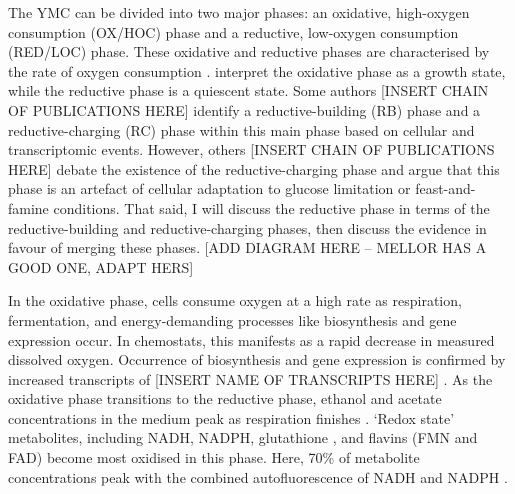 The YMC can be divided into two major phases: an oxidative, high-oxygen consumption (OX/HOC) phase and a reductive, low-oxygen consumption (RED/LOC) phase.
These oxidative and reductive phases are characterised by the rate of oxygen consumption \citep{mellorMolecularBasisMetabolic2016}.
\citet{krishnaMinimalPushPull2018} interpret the oxidative phase as a growth state, while the reductive phase is a quiescent state.
Some authors [INSERT CHAIN OF PUBLICATIONS HERE] identify a reductive-building (RB) phase and a reductive-charging (RC) phase within this main phase based on cellular and transcriptomic events.
However, others [INSERT CHAIN OF PUBLICATIONS HERE] debate the existence of the reductive-charging phase and argue that this phase is an artefact of cellular adaptation to glucose limitation or feast-and-famine conditions.
That said, I will discuss the reductive phase in terms of the reductive-building and reductive-charging phases, then discuss the evidence in favour of merging these phases.
[ADD DIAGRAM HERE -- MELLOR HAS A GOOD ONE, ADAPT HERS]

In the oxidative phase, cells consume oxygen at a high rate as respiration, fermentation, and
energy-demanding processes
like biosynthesis and gene expression occur.
In chemostats, this manifests as a rapid decrease in measured dissolved oxygen.
Occurrence of biosynthesis and gene expression is confirmed by increased transcripts of [INSERT NAME OF TRANSCRIPTS HERE] \parencite{tuLogicYeastMetabolic2005}.
As the oxidative phase transitions to the reductive phase, ethanol and acetate concentrations in the medium peak as respiration finishes \citep{tuLogicYeastMetabolic2005}.
`Redox state' metabolites, including NADH, NADPH, glutathione \citep{lloydUltradianMetronomeTimekeeper2005}, and flavins (FMN and FAD) %
\parencite{murrayRedoxRegulationRespiring2011} become most oxidised in this phase.
Here, 70\% of metabolite concentrations peak with the combined autofluorescence of NADH and NADPH \citep{murrayRegulationYeastOscillatory2007}.

